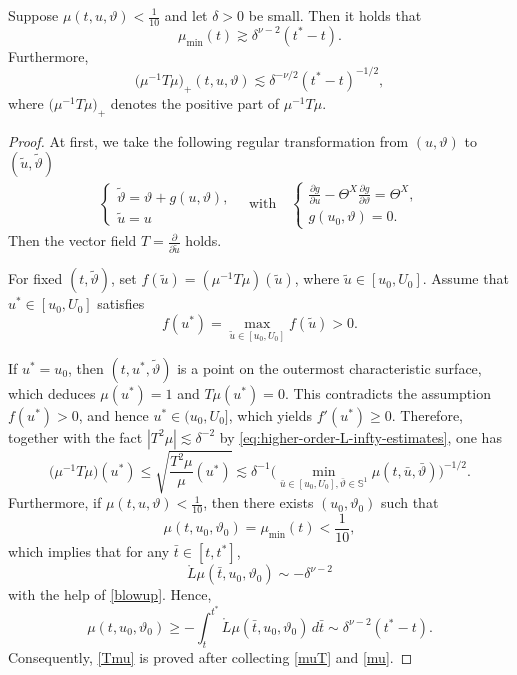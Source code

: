 \documentclass[11pt,twoside]{article}
\def\de{\delta}
\def\f{\frac}
\def\p{\partial}
\begin{document}
\begin{proposition}
Suppose $\mu(t, u, \vartheta) < \frac{1}{10}$ and let $\delta > 0$ be small. Then it holds that
\begin{equation}\label{mumin}
\mu_{\min}(t)\gtrsim\de^{\nu-2}(t^*-t).
\end{equation}
Furthermore,
\begin{equation}\label{Tmu}
\bigl( \mu^{-1} T\mu \bigr)_{+}(t, u, \vartheta) \lesssim \delta^{-\nu/2} (t^* - t)^{-1/2},
\end{equation}
where $\bigl( \mu^{-1} T\mu \bigr)_{+}$ denotes the positive part of $\mu^{-1} T\mu$.
\end{proposition}
\begin{proof}
 At first, we take the following regular transformation from $(u,\vartheta)$ to $(\tilde{u}, \tilde{\vartheta})$
 \[
 \begin{array}{l}
 \begin{cases}
 \tilde{\vartheta} = \vartheta + g(u, \vartheta), \\
 \tilde{u} = u
 \end{cases}
 \quad \text{with} \quad
 \begin{cases}
 \frac{\partial g}{\partial u} - \Theta^X \frac{\partial g}{\partial \vartheta} = \Theta^X, \\
 g\left(u_0, \vartheta\right) = 0.
 \end{cases}
 \end{array}
 \]
 Then the vector field $T=\f{\p}{\p\tilde u}$ holds.

 For fixed $(t,\tilde\vartheta)$, set $f(\tilde u)=(\mu^{-1}T\mu)(\tilde u)$, where $\tilde u\in [u_0,U_0]$. Assume that $u^*\in [u_0,U_0]$ satisfies
 \[
 f(u^*)=\max_{\tilde u\in[u_0,U_0]}f(\tilde u)>0.
 \]

 If $u^* = u_0$, then $(t, u^*, \tilde{\vartheta})$ is a point on the outermost characteristic surface, which deduces $\mu(u^*) = 1$ and $T\mu(u^*) = 0$. This contradicts the assumption $f(u^*) > 0$, and hence $u^* \in(u_0, U_0]$, which yields $f'(u^*) \geq 0$. Therefore, together with the fact $|T^2\mu| \lesssim \delta^{-2}$ by \eqref{eq:higher-order-L-infty-estimates}, one has
 \begin{equation}\label{muT}
 \bigl(\mu^{-1}T\mu\bigr)(u^*) \leq \sqrt{\dfrac{T^2\mu}{\mu}(u^*)} \lesssim \delta^{-1} \big( \min_{\bar u \in [u_0, U_0], \bar\vartheta \in \mathbb{S}^1} \mu(t, \bar u, \bar\vartheta) \big)^{-1/2}.
 \end{equation}
 Furthermore, if $\mu(t, u, \vartheta) < \frac{1}{10}$, then there exists $(u_0, \vartheta_0)$ such that
 \[
 \mu(t, u_0, \vartheta_0) = \mu_{\min}(t)< \frac{1}{10},
 \]
 which implies that for any $\bar{t} \in [t, t^*]$,
 \[
 \mathring{L}\mu(\bar{t}, u_0, \vartheta_0) \sim -\delta^{\nu-2}
 \]
 with the help of \eqref{blowup}. Hence,
 \begin{equation}\label{mu}
 \mu(t, u_0, \vartheta_0) \geq -\int_t^{t^*} \mathring{L}\mu(\bar{t}, u_0, \vartheta_0) \, d\bar{t} \sim \delta^{\nu-2}(t^* - t).
 \end{equation}
 Consequently, \eqref{Tmu} is proved after collecting \eqref{muT} and \eqref{mu}.
\end{proof}
\end{document}
